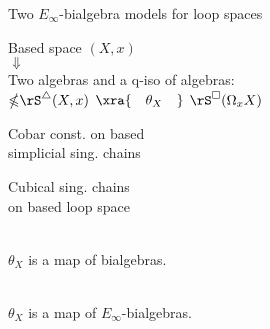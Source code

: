 \begin{frame}[fragile]{Two $E_\infty$-bialgebra models for loop spaces}
	\pause
	\vspace*{-1pt}
	\begin{center}
		Based space $(X,x)$ \\ \pause
		$\Downarrow$ \\
		Two algebras
		and a q-iso of algebras: \\
		\medskip
		$\mathbb{\Omega} \rS^{\triangle}(X, x)$
		$\xra{\quad \theta_X \quad }$
		$\rS^{\square}(\Omega_x X)$
	\end{center}

	\begin{minipage}{.45\textwidth}
		\begin{flushright}
			Cobar const. on based \\
			simplicial sing. chains
		\end{flushright}
	\end{minipage}
	\hspace*{.9cm}
	\begin{minipage}{.4\textwidth}
		Cubical sing. chains \\
		on based loop space
	\end{minipage}

	\bigskip\smallskip\pause
	 \\
	$\theta_X$ is a map of bialgebras.

	\bigskip\pause
	 \\
	$\theta_X$ is a map of $E_\infty$-bialgebras.
\end{frame}